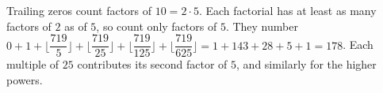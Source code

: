 Trailing zeros count factors of $10=2\cdot5$. Each factorial has at least as many factors of $2$ as of $5$, so count only factors of $5$. They number $0 + 1 + \lfloor \dfrac{719}{5} \rfloor + \lfloor \dfrac{719}{25} \rfloor + \lfloor \dfrac{719}{125} \rfloor + \lfloor \dfrac{719}{625} \rfloor = 1 + 143 + 28 + 5 + 1 = \boxed{178}$. Each multiple of $25$ contributes its second factor of $5$, and similarly for the higher powers.
